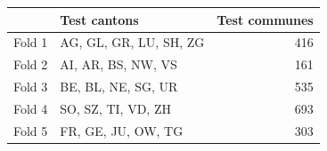 \begin{tabular}{llr}
\toprule
 & Test cantons & Test communes \\
\midrule
Fold 1 & AG, GL, GR, LU, SH, ZG & 416 \\
Fold 2 & AI, AR, BS, NW, VS & 161 \\
Fold 3 & BE, BL, NE, SG, UR & 535 \\
Fold 4 & SO, SZ, TI, VD, ZH & 693 \\
Fold 5 & FR, GE, JU, OW, TG & 303 \\
\bottomrule
\end{tabular}

